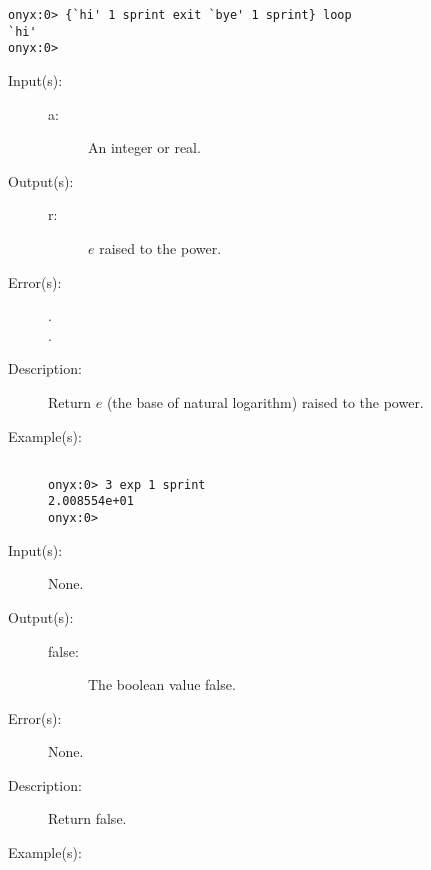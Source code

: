 \begin{description}
\begin{description}
\begin{verbatim}
onyx:0> {`hi' 1 sprint exit `bye' 1 sprint} loop
`hi'
onyx:0>
		\end{verbatim}
	\end{description}
\label{systemdict:exp}
\item[{\onyxop{b}{exp}{r}}: ]
	\begin{description}\item[]
	\item[Input(s): ]
		\begin{description}\item[]
		\item[a: ]
			An integer or real.
		\end{description}
	\item[Output(s): ]
		\begin{description}\item[]
		\item[r: ]
			$e$ raised to the  power.
		\end{description}
	\item[Error(s): ]
		\begin{description}\item[]
		\item[.]
		\item[.]
		\end{description}
	\item[Description: ]
		Return $e$ (the base of natural logarithm) raised to the
		 power.
	\item[Example(s): ]\begin{verbatim}

onyx:0> 3 exp 1 sprint
2.008554e+01
onyx:0>
		\end{verbatim}
	\end{description}
\label{systemdict:false}
\item[{\onyxop{--}{false}{false}}: ]
	\begin{description}\item[]
	\item[Input(s): ] None.
	\item[Output(s): ]
		\begin{description}\item[]
		\item[false: ]
			The boolean value false.
		\end{description}
	\item[Error(s): ] None.
	\item[Description: ]
		Return false.
	\item[Example(s): ]\begin{verbatim}


\end{verbatim}
\end{description}
\end{description}
